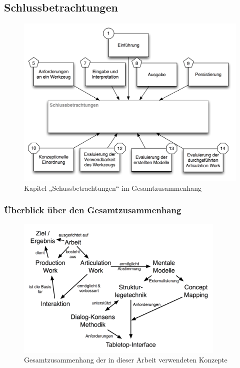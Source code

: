 \part*{}

\chapter{Schlussbetrachtungen} %
\label{cha:schlussbetrachtungen}

\begin{figure}[htbp]
	\centering
		\includegraphics[scale=0.7]{img/Kontextgrafiken/k15.png}
	\caption{Kapitel „Schussbetrachtungen“ im Gesamtzusammenhang}
	\label{fig:img_Kontextgrafiken_k15}
\end{figure}

\section{Überblick über den Gesamtzusammenhang} %
\label{sec:überblick_über_den_gesamtzusammenhang}

\begin{figure}[htbp]
	\centering
		\includegraphics[width=10cm]{img/Schlussbetrachtungen/ArbeitInteraktionMentaleModelleTabletop.png}
	\caption{Gesamtzusammenhang der in dieser Arbeit verwendeten Konzepte}
	\label{fig:img_Schlussbetrachtungen_ArbeitInteraktionMentaleModelleTabletop}
\end{figure}

